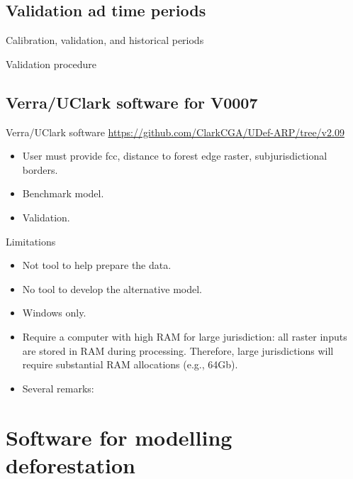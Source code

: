 \documentclass[10pt,table,dvipsnames,compress]{beamer}
\begin{document}
\subsection{Validation ad time periods}
\label{sec:orgc872f77}

\begin{frame}[label={sec:org295ce25}]{Calibration, validation, and historical periods}
\end{frame}

\begin{frame}[label={sec:org053acbb}]{Validation procedure}
\end{frame}

\subsection{Verra/UClark software for V0007}
\label{sec:org94f26f5}

\begin{frame}[label={sec:org588bdc8}]{Verra/UClark software}
\url{https://github.com/ClarkCGA/UDef-ARP/tree/v2.09}

\begin{itemize}
\item User must provide fcc, distance to forest edge raster, subjurisdictional borders.
\item Benchmark model.
\item Validation.
\end{itemize}
\end{frame}

\begin{frame}[label={sec:org6715739}]{Limitations}
\begin{itemize}
\item Not tool to help prepare the data.
\item No tool to develop the alternative model.
\item Windows only.
\item Require a computer with high RAM for large jurisdiction: all raster inputs are stored in RAM during processing. Therefore, large jurisdictions will require substantial RAM allocations (e.g., 64Gb).
\item Several remarks:
\end{itemize}
\end{frame}

\section{Software for modelling deforestation}
\label{sec:orga03d40b}
\end{document}
